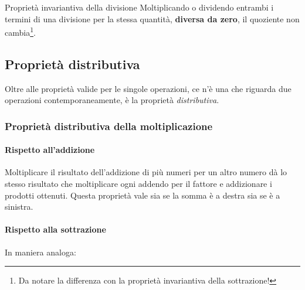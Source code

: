 \begin{definizione}{Proprietà invariantiva della divisione}{}
Moltiplicando o dividendo entrambi i termini di una divisione per 
la stessa quantità, \textbf{diversa da zero}, 
il quoziente non cambia\footnote{
Da notare la differenza con la proprietà invariantiva della sottrazione!}.
\end{definizione}

\subsection{Proprietà distributiva}

Oltre alle proprietà valide per le singole operazioni, ce n'è una che 
riguarda due operazioni contemporaneamente, è la proprietà 
\emph{distributiva}.

\subsubsection{Proprietà distributiva della moltiplicazione}

\paragraph{Rispetto all'addizione}
Moltiplicare il risultato dell'addizione di più numeri per un altro numero 
dà lo stesso risultato che moltiplicare ogni addendo per il fattore e 
addizionare i prodotti ottenuti. Questa proprietà vale sia se la somma è a 
destra sia se è a sinistra.


\paragraph{Rispetto alla sottrazione}
In maniera analoga:


